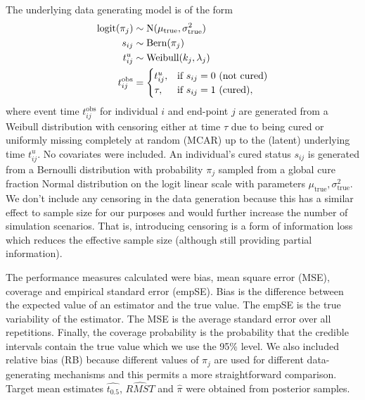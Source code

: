 \documentclass[AMA,STIX1COL]{WileyNJD-v2}
\begin{document}
The underlying data generating model is of the form
\begin{align}
    \notag
    \text{logit}(\pi_j) &\sim \text{N}(\mu_{\text{true}}, \sigma^2_{\text{true}}) \\
    \notag
    s_{ij} &\sim \text{Bern}(\pi_j)\\
    \label{eqn:data-generation}
    t^{u}_{ij} &\sim \text{Weibull}(k_j, \lambda_j)\\
    \notag
    t_{ij}^{\text{obs}} &= 
    \notag
    \begin{cases} 
    \notag
    t^{u}_{ij}, & \text{if } s_{ij} = 0 \text{ (not cured)} \\
    \notag
    \tau, & \text{if } s_{ij} = 1 \text{ (cured)},
    \notag
    \end{cases}
    \notag
\end{align}
where event time $t_{ij}^{\text{obs}}$ for individual $i$ and end-point $j$ are generated from a Weibull distribution with censoring either at time $\tau$ due to being cured or uniformly missing completely at random (MCAR) up to the (latent) underlying time $t^{u}_{ij}$. No covariates were included. An individual's cured status $s_{ij}$ is generated from a Bernoulli distribution with probability $\pi_j$ sampled from a global cure fraction Normal distribution on the logit linear scale with parameters $\mu_{\text{true}}, \sigma^2_{\text{true}}$. We don't include any censoring in the data generation because this has a similar effect to sample size for our purposes and would further increase the number of simulation scenarios. That is, introducing censoring is a form of information loss which reduces the effective sample size (although still providing partial information). 

The performance measures calculated were bias, mean square error (MSE), coverage and empirical standard error (empSE).
Bias is the difference between the expected value of an estimator and the true value. The empSE is the true variability of the estimator. The MSE is the average standard error over all repetitions. Finally, the coverage probability is the probability that the credible intervals contain the true value which we use the 95\% level.
We also included relative bias (RB) because different values of $\pi_j$ are used for different data-generating mechanisms and this permits a more straightforward comparison.
Target mean estimates $\widehat{t_{0.5}}$, $\widehat{RMST}$ and $\widehat{\pi}$ were obtained from posterior samples.
\end{document}
